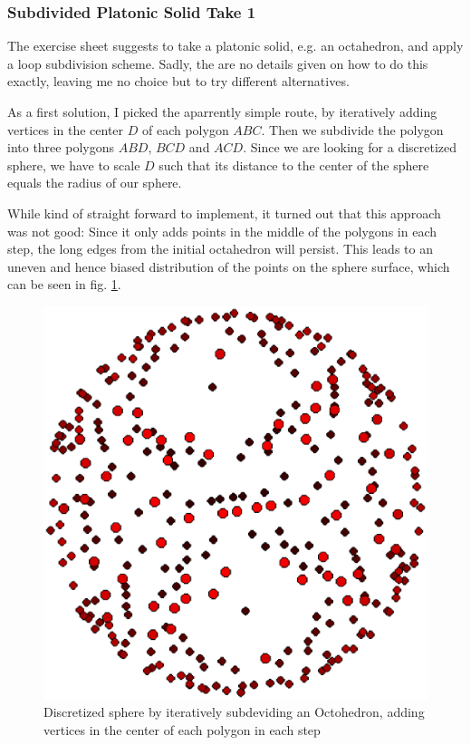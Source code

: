 \documentclass[a4paper,10pt,notitlepage]{scrreprt}
\begin{document}
\subsubsection{Subdivided Platonic Solid Take 1}

The exercise sheet suggests to take a platonic solid, e.g. an octahedron, and
apply a loop subdivision scheme. Sadly, the are no details given on how to do
this exactly, leaving me no choice but to try different alternatives.

As a first solution, I picked the aparrently simple route, by iteratively adding
vertices in the center $D$ of each polygon $ABC$. Then we subdivide the polygon
into three polygons $ABD$, $BCD$ and $ACD$. Since we are looking for a
discretized sphere, we have to scale $D$ such that its distance to the center of
the sphere equals the radius of our sphere.

While kind of straight forward to implement, it turned out that this approach
was not good: Since it only adds points in the middle of the polygons in each
step, the long edges from the initial octahedron will persist. This leads to an
uneven and hence biased distribution of the points on the sphere surface, which
can be seen in fig. \ref{fig:grid-platonic2}.

\begin{figure}
 \centering
 \includegraphics[scale=0.5]{platonic-1-grid.eps}
 \caption{Discretized sphere by iteratively subdeviding an Octohedron, adding
vertices in the center of each polygon in each step}
 \label{fig:grid-platonic2}
\end{figure}
\end{document}
